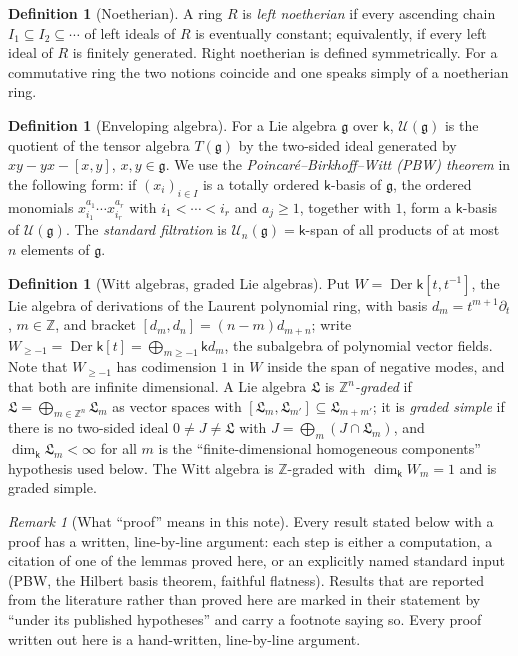 \documentclass[11pt]{ctexart}
\theoremstyle{plain}
\theoremstyle{definition}
\newtheorem{definition}[theorem]{Definition}
\theoremstyle{remark}
\newtheorem{remark}[theorem]{Remark}
\newcommand{\kk}{\mathsf{k}}
\newcommand{\gl}{\mathfrak{g}}
\newcommand{\LL}{\mathfrak{L}}
\newcommand{\UU}{\mathcal{U}}
\newcommand{\Der}{\operatorname{Der}}
\begin{document}
\begin{definition}[Noetherian]\label{def:noetherian}
A ring $R$ is \emph{left noetherian} if every ascending chain
$I_1\subseteq I_2\subseteq\cdots$ of left ideals of $R$ is eventually constant;
equivalently, if every left ideal of $R$ is finitely generated. Right noetherian is
defined symmetrically. For a commutative ring the two notions coincide and one
speaks simply of a noetherian ring.
\end{definition}

\begin{definition}[Enveloping algebra]\label{def:U}
For a Lie algebra $\gl$ over $\kk$, $\UU(\gl)$ is the quotient of the tensor algebra
$T(\gl)$ by the two-sided ideal generated by $xy-yx-[x,y]$, $x,y\in\gl$. We use the
\emph{Poincar\'e--Birkhoff--Witt (PBW) theorem} in the following form: if
$(x_i)_{i\in I}$ is a totally ordered $\kk$-basis of $\gl$, the ordered monomials
$x_{i_1}^{a_1}\cdots x_{i_r}^{a_r}$ with $i_1<\cdots<i_r$ and $a_j\ge1$, together
with $1$, form a $\kk$-basis of $\UU(\gl)$. The \emph{standard filtration} is
$\UU_n(\gl)=\kk$-span of all products of at most $n$ elements of $\gl$.
\end{definition}

\begin{definition}[Witt algebras, graded Lie algebras]\label{def:witt}
Put $W=\Der\kk[t,t^{-1}]$, the Lie algebra of derivations of the Laurent polynomial
ring, with basis $d_m=t^{m+1}\partial_t$, $m\in\mathbb{Z}$, and bracket
$[d_m,d_n]=(n-m)d_{m+n}$; write $W_{\ge-1}=\Der\kk[t]=\bigoplus_{m\ge-1}\kk d_m$, the
subalgebra of polynomial vector fields. Note that $W_{\ge-1}$ has codimension $1$ in
$W$ inside the span of negative modes, and that both are infinite dimensional.
A Lie algebra $\LL$ is \emph{$\mathbb{Z}^n$-graded} if
$\LL=\bigoplus_{m\in\mathbb{Z}^n}\LL_m$ as vector spaces with
$[\LL_m,\LL_{m'}]\subseteq\LL_{m+m'}$; it is \emph{graded simple} if there is no
two-sided ideal $0\neq J\neq\LL$ with $J=\bigoplus_m (J\cap\LL_m)$, and
$\dim_\kk\LL_m<\infty$ for all $m$ is the ``finite-dimensional homogeneous
components'' hypothesis used below. The Witt algebra is $\mathbb{Z}$-graded with
$\dim_\kk W_m=1$ and is graded simple.
\end{definition}

\begin{remark}[What ``proof'' means in this note]\label{rem:standard}
Every result stated below with a proof has a written, line-by-line argument: each
step is either a computation, a citation of one of the lemmas proved here, or an
explicitly named standard input (PBW, the Hilbert basis theorem, faithful flatness).
Results that are reported from the literature rather than proved here are marked in
their statement by ``under its published hypotheses'' and carry a footnote saying so.
Every proof written out here is a hand-written, line-by-line argument.
\end{remark}
\end{document}
